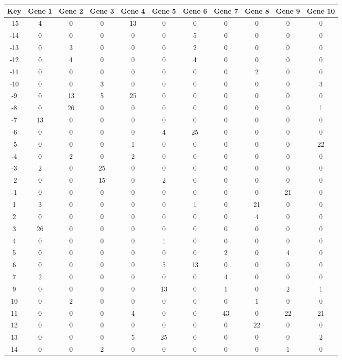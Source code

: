 \begin{tabular}{|c|c|c|c|c|c|c|c|c|c|c|}
\hline
Key & Gene 1 & Gene 2 & Gene 3 & Gene 4 & Gene 5 & Gene 6 & Gene 7 & Gene 8 & Gene 9 & Gene 10 \\
\hline
-15 & 4 & 0 & 0 & 13 & 0 & 0 & 0 & 0 & 0 & 0 \\
-14 & 0 & 0 & 0 & 0 & 0 & 5 & 0 & 0 & 0 & 0 \\
-13 & 0 & 3 & 0 & 0 & 0 & 2 & 0 & 0 & 0 & 0 \\
-12 & 0 & 4 & 0 & 0 & 0 & 4 & 0 & 0 & 0 & 0 \\
-11 & 0 & 0 & 0 & 0 & 0 & 0 & 0 & 2 & 0 & 0 \\
-10 & 0 & 0 & 3 & 0 & 0 & 0 & 0 & 0 & 0 & 3 \\
-9 & 0 & 13 & 5 & 25 & 0 & 0 & 0 & 0 & 0 & 0 \\
-8 & 0 & 26 & 0 & 0 & 0 & 0 & 0 & 0 & 0 & 1 \\
-7 & 13 & 0 & 0 & 0 & 0 & 0 & 0 & 0 & 0 & 0 \\
-6 & 0 & 0 & 0 & 0 & 4 & 25 & 0 & 0 & 0 & 0 \\
-5 & 0 & 0 & 0 & 1 & 0 & 0 & 0 & 0 & 0 & 22 \\
-4 & 0 & 2 & 0 & 2 & 0 & 0 & 0 & 0 & 0 & 0 \\
-3 & 2 & 0 & 25 & 0 & 0 & 0 & 0 & 0 & 0 & 0 \\
-2 & 0 & 0 & 15 & 0 & 2 & 0 & 0 & 0 & 0 & 0 \\
-1 & 0 & 0 & 0 & 0 & 0 & 0 & 0 & 0 & 21 & 0 \\
1 & 3 & 0 & 0 & 0 & 0 & 1 & 0 & 21 & 0 & 0 \\
2 & 0 & 0 & 0 & 0 & 0 & 0 & 0 & 4 & 0 & 0 \\
3 & 26 & 0 & 0 & 0 & 0 & 0 & 0 & 0 & 0 & 0 \\
4 & 0 & 0 & 0 & 0 & 1 & 0 & 0 & 0 & 0 & 0 \\
5 & 0 & 0 & 0 & 0 & 0 & 0 & 2 & 0 & 4 & 0 \\
6 & 0 & 0 & 0 & 0 & 5 & 13 & 0 & 0 & 0 & 0 \\
7 & 2 & 0 & 0 & 0 & 0 & 0 & 4 & 0 & 0 & 0 \\
9 & 0 & 0 & 0 & 0 & 13 & 0 & 1 & 0 & 2 & 1 \\
10 & 0 & 2 & 0 & 0 & 0 & 0 & 0 & 1 & 0 & 0 \\
11 & 0 & 0 & 0 & 4 & 0 & 0 & 43 & 0 & 22 & 21 \\
12 & 0 & 0 & 0 & 0 & 0 & 0 & 0 & 22 & 0 & 0 \\
13 & 0 & 0 & 0 & 5 & 25 & 0 & 0 & 0 & 0 & 2 \\
14 & 0 & 0 & 2 & 0 & 0 & 0 & 0 & 0 & 1 & 0 \\
\hline
\end{tabular}